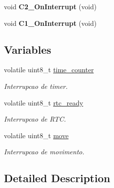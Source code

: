 \begin{DoxyCompactItemize}
\item 
\hypertarget{group___events__module_ga3366e31481821b88971f3b76ef44f925}{void {\bfseries C2\-\_\-\-On\-Interrupt} (void)}\label{group___events__module_ga3366e31481821b88971f3b76ef44f925}

\item 
\hypertarget{group___events__module_ga58156bc0de5d485e4148891f6188f998}{void {\bfseries C1\-\_\-\-On\-Interrupt} (void)}\label{group___events__module_ga58156bc0de5d485e4148891f6188f998}

\end{DoxyCompactItemize}
\subsection*{Variables}
\begin{DoxyCompactItemize}
\item 
\hypertarget{group___events__module_ga31e91be760295a7e79d975c1567f3c80}{volatile uint8\-\_\-t \hyperlink{group___events__module_ga31e91be760295a7e79d975c1567f3c80}{time\-\_\-counter}}\label{group___events__module_ga31e91be760295a7e79d975c1567f3c80}

\begin{DoxyCompactList}\small\item\em Interrupcao de timer. \end{DoxyCompactList}\item 
\hypertarget{group___events__module_ga7633574c3e3924ff2d07ee88bba5a018}{volatile uint8\-\_\-t \hyperlink{group___events__module_ga7633574c3e3924ff2d07ee88bba5a018}{rtc\-\_\-ready}}\label{group___events__module_ga7633574c3e3924ff2d07ee88bba5a018}

\begin{DoxyCompactList}\small\item\em Interrupcao de R\-T\-C. \end{DoxyCompactList}\item 
\hypertarget{group___events__module_ga3ec3246b6885ab76d880359df143c477}{volatile uint8\-\_\-t \hyperlink{group___events__module_ga3ec3246b6885ab76d880359df143c477}{move}}\label{group___events__module_ga3ec3246b6885ab76d880359df143c477}

\begin{DoxyCompactList}\small\item\em Interrupcao de movimento. \end{DoxyCompactList}\end{DoxyCompactItemize}


\subsection{Detailed Description}


